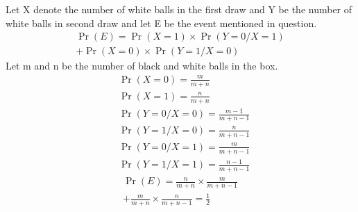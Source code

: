 
Let X denote the number of white balls in the first draw and Y be the number of white balls in second draw and let E be the event mentioned in question.
\begin{multline}
\Pr(E) = \Pr(X=1)\times \Pr(Y=0/X=1) \\
+ \Pr(X=0)\times \Pr(Y=1/X=0)
\end{multline}
Let m and n be the number of black and white balls in the box.
\begin{align}
&\Pr(X=0) = \frac{m}{m+n} \\ 
&\Pr(X=1)=\frac{n}{m+n}\\
&\Pr(Y=0/X=0)=\frac{m-1}{m+n-1}\\
&\Pr(Y=1/X=0)=\frac{n}{m+n-1}\\
&\Pr(Y=0/X=1)=\frac{m}{m+n-1}\\
&\Pr(Y=1/X=1)=\frac{n-1}{m+n-1}
\end{align}
\begin{multline}
\Pr(E)=\frac{n}{m+n}\times \frac{m}{m+n-1}\\
+\frac{m}{m+n}\times\frac{n}{m+n-1}=\frac{1}{2}
\end{multline}